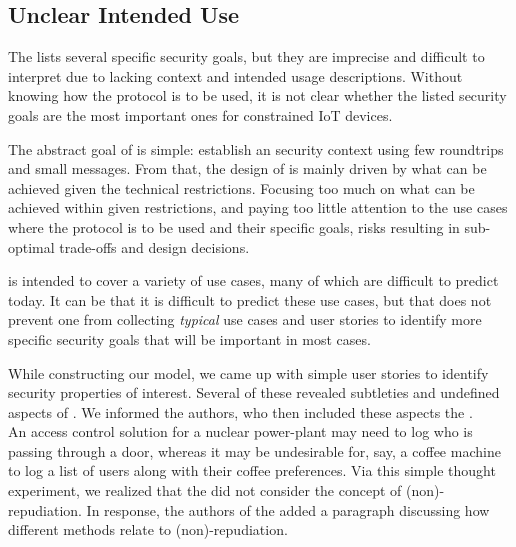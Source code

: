 \documentclass[runningheads, envcountsame, hidelinks, a4paper, draft, x11names]{llncs}
\begin{document}
\subsection{Unclear Intended Use}
\label{sec:unclearProtocolUse}
%
The \mEdhoc{} \mSpec{} lists several specific security goals, but they are
imprecise and difficult to interpret due to lacking context and intended usage
descriptions.
%
Without knowing how the protocol is to be used,
it is not clear whether the listed security goals are the most important ones
for constrained IoT devices.
%

The abstract goal of \mEdhoc{} is simple: establish an \mOscore{} security
context using few roundtrips and small messages.
%
From that, the design of \mEdhoc{} is mainly driven by what
can be achieved given the technical restrictions.
%
Focusing too much on what can be achieved within given restrictions, and paying
too little attention to the use cases where the
protocol is to be used and their specific goals, risks resulting in
sub-optimal trade-offs and design decisions.
%

\mEdhoc{} is intended to cover a variety of use cases, many of which are
difficult to predict today.
%
It can be that it is difficult to predict these use cases, but that does not
prevent one from collecting \emph{typical} use cases and user stories
to identify more specific security goals that will be important in most cases.
%

While constructing our model, we came up with simple user stories to identify
security properties of interest.
%
Several of these revealed subtleties and undefined aspects of \mEdhoc{}.
%
We informed the \mEdhoc{} authors, who then included these aspects the
\mSpec{}.\\
%

An access control solution for a nuclear power-plant may need to log who is
passing through a door, whereas it may be undesirable for, say, a coffee
machine to log a list of users along with their coffee preferences.
%
Via this simple thought experiment, we realized that the \mSpec{} did not
consider the concept of (non)-repudiation.
%
In response, the authors of the \mSpec{} added a paragraph discussing how
different methods relate to (non)-repudiation.\\
\end{document}
